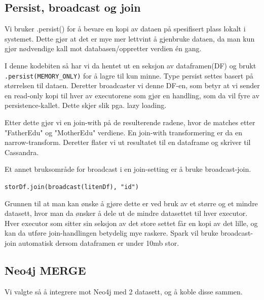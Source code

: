\subsection{Persist, broadcast og join}
Vi bruker .persist() for å bevare en kopi av dataen på spesifisert plass lokalt i systemet. Dette gjør at det er mye mer lettvint å gjenbruke dataen, da man kun gjør nødvendige kall mot databasen/oppretter verdien én gang.




I denne kodebiten så har vi da hentet ut en seksjon av dataframen(DF) og brukt \lstinline{.persist(MEMORY_ONLY)} for å lagre til kun minne. Type persist settes basert på størrelsen til dataen. Deretter broadcaster vi denne DF-en, som betyr at vi sender en read-only kopi til hver av executorene som gjør en handling, som da vil fyre av persistence-kallet. Dette skjer slik pga. lazy loading.


Etter dette gjør vi en join-with på de resulterende radene, hvor de matches etter "FatherEdu" og "MotherEdu" verdiene. En join-with transformering er da en narrow-transform. Deretter flater vi ut resultatet til en dataframe og skriver til Cassandra.


Et annet bruksområde for broadcast i en join-setting er å bruke broadcast-join.


\lstinline {storDf.join(broadcast(litenDf), "id")}


Grunnen til at man kan ønske å gjøre dette er ved bruk av et større og et mindre datasett, hvor man da ønsker å dele ut de mindre datasettet til hver executor. Hver executor som sitter sin seksjon av det store settet får en kopi av det lille, og kan da utføre join-handlingen betydelig mye raskere. Spark vil bruke broadcast-join automatisk dersom dataframen er under 10mb stor.


\subsection{Neo4j MERGE}
Vi valgte så å integrere mot Neo4j med 2 datasett, og å koble disse sammen.






